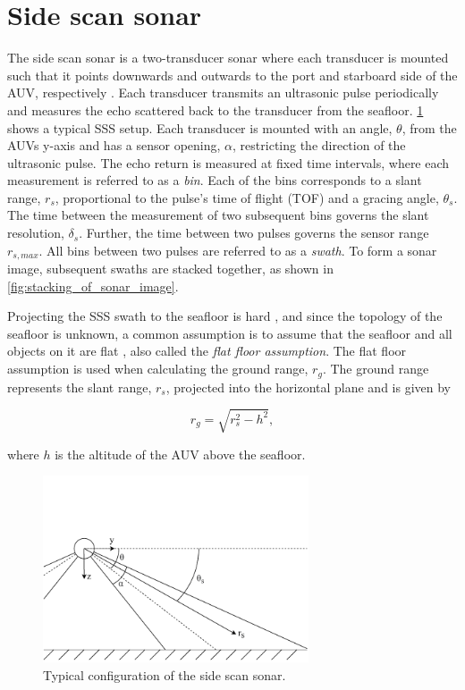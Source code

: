 \section{Side scan sonar}

The side scan sonar is a two-transducer sonar where each transducer is mounted such that it points downwards and outwards to the port and starboard side of the AUV, respectively \cite{Burguera2016High-ResolutionSonar}. Each transducer transmits an ultrasonic pulse periodically and measures the echo scattered back to the transducer from the seafloor. \cref{fig:sss} shows a typical SSS setup. Each transducer is mounted with an angle, $\theta$, from the AUVs y-axis and has a sensor opening, $\alpha$, restricting the direction of the ultrasonic pulse. The echo return is measured at fixed time intervals, where each measurement is referred to as a \textit{bin}. Each of the bins corresponds to a slant range, $r_s$, proportional to the pulse's time of flight (TOF) and a gracing angle, $\theta_s$. The time between the measurement of two subsequent bins governs the slant resolution, $\delta_s$. Further, the time between two pulses governs the sensor range $r_{s, max}$. All bins between two pulses are referred to as a \textit{swath}. To form a sonar image, subsequent swaths are stacked together, as shown in \cref{fig:stacking_of_sonar_image}. 

Projecting the SSS swath to the seafloor is hard \cite{Coiras2007MultiresolutionImages}, and since the topology of the seafloor is unknown, a common assumption is to assume that the seafloor and all objects on it are flat \cite{Burguera2016High-ResolutionSonar, Shin2015BundleMapping, Burguera2014IntensityImages, Fallon2011EfficientSonar}, also called the \textit{flat floor assumption}. The flat floor assumption is used when calculating the ground range, $r_g$. The ground range represents the slant range, $r_s$, projected into the horizontal plane and is given by

\begin{equation}
    r_g = \sqrt{r_s^2 - h^2},
    \label{eq:ground_range}
\end{equation}

where $h$ is the altitude of the AUV above the seafloor.

\begin{figure}[ht]
    \centering
    \includegraphics[trim=0cm 0cm 0cm 3.1cm, clip=true, width=0.7\textwidth]{figures/sss.drawio.pdf}
    \caption{Typical configuration of the side scan sonar.}
    \label{fig:sss}
\end{figure}

